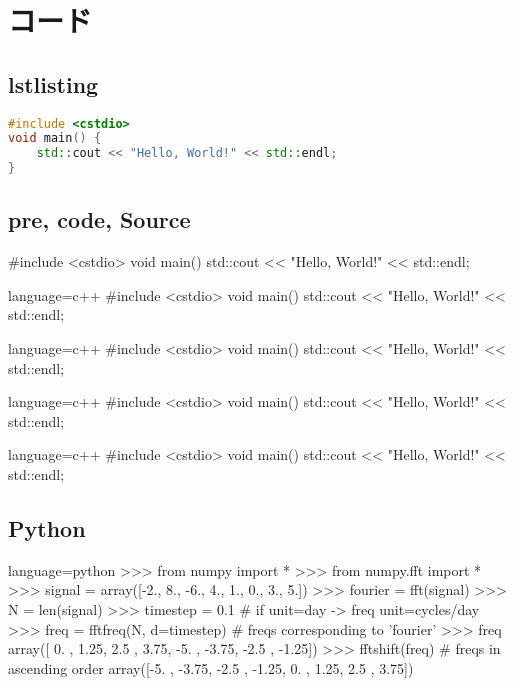 \documentclass[../main]{subfiles}
\begin{document}
\setcounter{section}{3}
\section{コード}

\subsection{lstlisting}
\begin{lstlisting}[language=c++]
#include <cstdio>
void main() {
    std::cout << "Hello, World!" << std::endl;
}
\end{lstlisting}

\subsection{pre, code, Source}
\begin{Pre}{}
#include <cstdio>
void main() {
    std::cout << "Hello, World!" << std::endl;
}
\end{Pre}

\begin{Code}{language=c++}
#include <cstdio>
void main() {
    std::cout << "Hello, World!" << std::endl;
}
\end{Code}

\begin{NCode}{language=c++}
#include <cstdio>
void main() {
    std::cout << "Hello, World!" << std::endl;
}
\end{NCode}

\begin{Source}{language=c++}
#include <cstdio>
void main() {
	std::cout << "Hello, World!" << std::endl;
}
\end{Source}

\begin{NSource}{language=c++}
#include <cstdio>
void main() {
    std::cout << "Hello, World!" << std::endl;
}
\end{NSource}

\subsection{Python}
\begin{Code}{language=python}
>>> from numpy import *
>>> from numpy.fft import *
>>> signal = array([-2., 8., -6., 4., 1., 0., 3., 5.])
>>> fourier = fft(signal)
>>> N = len(signal)
>>> timestep = 0.1 # if unit=day -> freq unit=cycles/day
>>> freq = fftfreq(N, d=timestep) # freqs corresponding to 'fourier'
>>> freq
array([ 0. , 1.25, 2.5 , 3.75, -5. , -3.75, -2.5 , -1.25])
>>> fftshift(freq) # freqs in ascending order
array([-5. , -3.75, -2.5 , -1.25, 0. , 1.25, 2.5 , 3.75])
\end{Code}
\end{document}

